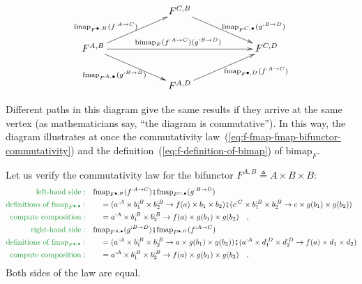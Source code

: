 \begin{wrapfigure}{l}{0.5\columnwidth}%
\vspace{-1.5\baselineskip}
\[
\xymatrix{\xyScaleY{2.0pc}\xyScaleX{5.0pc} & F^{C,B}\ar[rd]\sp(0.6){\ ~~\text{fmap}_{F^{C,\bullet}}(g^{:B\rightarrow D})}\\
F^{A,B}\ar[ru]\sp(0.4){\text{fmap}_{F^{\bullet,B}}(f^{:A\rightarrow C})~~~}\ar[rd]\sb(0.5){\text{fmap}_{F^{A,\bullet}}(g^{:B\rightarrow D})~~\ }\ar[rr]\sp(0.5){\text{bimap}_{F}(f^{:A\rightarrow C})(g^{:B\rightarrow D})\ } &  & F^{C,D}\\
 & F^{A,D}\ar[ru]\sb(0.6){~~~~\text{fmap}_{F^{\bullet,D}}(f^{:A\rightarrow C})}
}
\]

\vspace{-2.2\baselineskip}
\end{wrapfigure}%
Different paths in this diagram give the same results if they arrive
at the same vertex (as mathematicians say, \textsf{``}the diagram is commutative\textsf{''}).
In this way, the diagram illustrates at once the commutativity law~(\ref{eq:f-fmap-fmap-bifunctor-commutativity})
and the definition~(\ref{eq:f-definition-of-bimap}) of $\text{bimap}_{F}$.

Let us verify the commutativity law for the bifunctor
$F^{A,B}\triangleq A\times B\times B$:
\begin{align*}
{\color{greenunder}\text{left-hand side}:}\quad & \text{fmap}_{F^{\bullet,B}}(f^{:A\rightarrow C})\bef\text{fmap}_{F^{C,\bullet}}(g^{:B\rightarrow D})\\
{\color{greenunder}\text{definitions of }\text{fmap}_{F^{\bullet,\bullet}}:}\quad & \quad=(a^{:A}\times b_{1}^{:B}\times b_{2}^{:B}\rightarrow f(a)\times b_{1}\times b_{2})\bef(c^{:C}\times b_{1}^{:B}\times b_{2}^{:B}\rightarrow c\times g(b_{1})\times g(b_{2}))\\
{\color{greenunder}\text{compute composition}:}\quad & \quad=a^{:A}\times b_{1}^{:B}\times b_{2}^{:B}\rightarrow f(a)\times g(b_{1})\times g(b_{2})\quad,\\
{\color{greenunder}\text{right-hand side}:}\quad & \text{fmap}_{F^{A,\bullet}}(g^{:B\rightarrow D})\bef\text{fmap}_{F^{\bullet,D}}(f^{:A\rightarrow C})\\
{\color{greenunder}\text{definitions of }\text{fmap}_{F^{\bullet,\bullet}}:}\quad & \quad=(a^{:A}\times b_{1}^{:B}\times b_{2}^{:B}\rightarrow a\times g(b_{1})\times g(b_{2}))\bef(a^{:A}\times d_{1}^{:D}\times d_{2}^{:D}\rightarrow f(a)\times d_{1}\times d_{2})\\
{\color{greenunder}\text{compute composition}:}\quad & \quad=a^{:A}\times b_{1}^{:B}\times b_{2}^{:B}\rightarrow f(a)\times g(b_{1})\times g(b_{2})\quad.
\end{align*}
Both sides of the law are equal.

